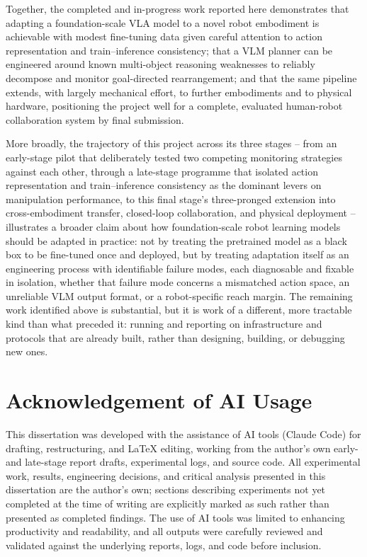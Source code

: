 \documentclass[12pt]{article}
\begin{document}
Together, the completed and in-progress work reported here demonstrates that adapting a foundation-scale VLA model to a novel robot embodiment is achievable with modest fine-tuning data given careful attention to action representation and train--inference consistency; that a VLM planner can be engineered around known multi-object reasoning weaknesses to reliably decompose and monitor goal-directed rearrangement; and that the same pipeline extends, with largely mechanical effort, to further embodiments and to physical hardware, positioning the project well for a complete, evaluated human-robot collaboration system by final submission.

More broadly, the trajectory of this project across its three stages -- from an early-stage pilot that deliberately tested two competing monitoring strategies against each other, through a late-stage programme that isolated action representation and train--inference consistency as the dominant levers on manipulation performance, to this final stage's three-pronged extension into cross-embodiment transfer, closed-loop collaboration, and physical deployment -- illustrates a broader claim about how foundation-scale robot learning models should be adapted in practice: not by treating the pretrained model as a black box to be fine-tuned once and deployed, but by treating adaptation itself as an engineering process with identifiable failure modes, each diagnosable and fixable in isolation, whether that failure mode concerns a mismatched action space, an unreliable VLM output format, or a robot-specific reach margin. The remaining work identified above is substantial, but it is work of a different, more tractable kind than what preceded it: running and reporting on infrastructure and protocols that are already built, rather than designing, building, or debugging new ones.

\section{Acknowledgement of AI Usage}

This dissertation was developed with the assistance of AI tools (Claude Code) for drafting, restructuring, and LaTeX editing, working from the author's own early- and late-stage report drafts, experimental logs, and source code. All experimental work, results, engineering decisions, and critical analysis presented in this dissertation are the author's own; sections describing experiments not yet completed at the time of writing are explicitly marked as such rather than presented as completed findings. The use of AI tools was limited to enhancing productivity and readability, and all outputs were carefully reviewed and validated against the underlying reports, logs, and code before inclusion.

\clearpage


\end{document}
